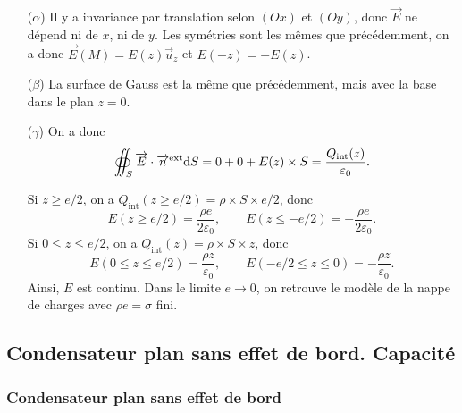                 \begin{enumerate}
                    \item [($\alpha$)] Il y a invariance par translation selon $(Ox)$ et $(Oy)$, donc $\vec{E}$ ne dépend ni de $x$, ni de $y$. Les symétries sont les mêmes que précédemment, on a donc $\vec{E}(M)=E(z)\vec{u}_z$ et $E(-z)=-E(z)$.
                    \item [($\beta$)] La surface de Gauss est la même que précédemment, mais avec la base dans le plan $z=0$.
                    \item [($\gamma$)] On a donc 
                    \begin{equation}
                        \oiint_{S}\protect\overrightarrow{{E}}\cdot\protect\overrightarrow{{n}}^{\text{ext}}\mathrm{d} S=0+0+E(z)\times S=\frac{Q_{\text{int}}(z)}{\varepsilon_0}.
                    \end{equation}

                    Si $z\geqslant e/2$, on a $Q_{\text{int}}(z\geqslant e/2)=\rho\times S\times e/2$, donc 
                    \begin{equation}
                        \boxed{
                        E(z\geqslant e/2)=\frac{\rho e}{2\varepsilon_0},\qquad E(z\leqslant -e/2)=-\frac{\rho e}{2\varepsilon_0}.}
                    \end{equation}
                    Si $0\leqslant z\leqslant e/2$, on a $Q_{\text{int}}(z)=\rho\times S\times z$, donc 
                    \begin{equation}
                        \boxed{
                        E(0\leqslant z\leqslant e/2)=\frac{\rho z}{\varepsilon_0},\qquad E(-e/2\leqslant z\leqslant 0)=-\frac{\rho z}{\varepsilon_0}.}
                    \end{equation}
                    Ainsi, $E$ est continu. Dans le limite $e\to0$, on retrouve le modèle de la nappe de charges avec $\rho e=\sigma$ fini.
                \end{enumerate}

    \subsection{Condensateur plan sans effet de bord. Capacité}
        \subsubsection{Condensateur plan sans effet de bord}

